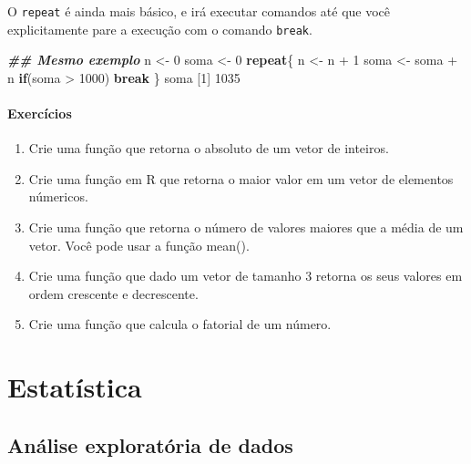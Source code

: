 \documentclass[
  10pt,
  a4paper]{book}
\newenvironment{Shaded}{\begin{snugshade}}{\end{snugshade}}
\newcommand{\ControlFlowTok}[1]{\textcolor[rgb]{0.13,0.29,0.53}{\textbf{#1}}}
\newcommand{\DecValTok}[1]{\textcolor[rgb]{0.00,0.00,0.81}{#1}}
\newcommand{\DocumentationTok}[1]{\textcolor[rgb]{0.56,0.35,0.01}{\textbf{\textit{#1}}}}
\newcommand{\NormalTok}[1]{#1}
\newcommand{\OtherTok}[1]{\textcolor[rgb]{0.56,0.35,0.01}{#1}}
\newcommand{\SpecialCharTok}[1]{\textcolor[rgb]{0.00,0.00,0.00}{#1}}
\providecommand{\tightlist}{%
  \setlength{\itemsep}{0pt}\setlength{\parskip}{0pt}}
\begin{document}
O \texttt{repeat} é ainda mais básico, e irá executar comandos até que você
explicitamente pare a execução com o comando \texttt{break}.

\begin{Shaded}
\begin{Highlighting}[]
\DocumentationTok{\#\# Mesmo exemplo}
\NormalTok{n }\OtherTok{\textless{}{-}} \DecValTok{0}
\NormalTok{soma }\OtherTok{\textless{}{-}} \DecValTok{0}
\ControlFlowTok{repeat}\NormalTok{\{}
\NormalTok{    n }\OtherTok{\textless{}{-}}\NormalTok{ n }\SpecialCharTok{+} \DecValTok{1}
\NormalTok{    soma }\OtherTok{\textless{}{-}}\NormalTok{ soma }\SpecialCharTok{+}\NormalTok{ n}
    \ControlFlowTok{if}\NormalTok{(soma }\SpecialCharTok{\textgreater{}} \DecValTok{1000}\NormalTok{) }\ControlFlowTok{break}
\NormalTok{\}}
\NormalTok{soma}
\NormalTok{[}\DecValTok{1}\NormalTok{] }\DecValTok{1035}
\end{Highlighting}
\end{Shaded}

\hypertarget{exercuxedcios-14}{%
\subsection*{Exercícios}\label{exercuxedcios-14}}


\begin{enumerate}
\def\labelenumi{\arabic{enumi}.}
\tightlist
\item
  Crie uma função que retorna o absoluto de um vetor de inteiros.
\item
  Crie uma função em R que retorna o maior valor em um vetor de elementos númericos.
\item
  Crie uma função que retorna o número de valores maiores que a média de um vetor. Você pode usar a função mean().
\item
  Crie uma função que dado um vetor de tamanho 3 retorna os seus valores em ordem crescente e decrescente.
\item
  Crie uma função que calcula o fatorial de um número.
\end{enumerate}

\hypertarget{part-estatuxedstica}{%
\part{Estatística}\label{part-estatuxedstica}}

\hypertarget{anuxe1lise-exploratuxf3ria-de-dados}{%
\chapter{Análise exploratória de dados}\label{anuxe1lise-exploratuxf3ria-de-dados}}
\end{document}

